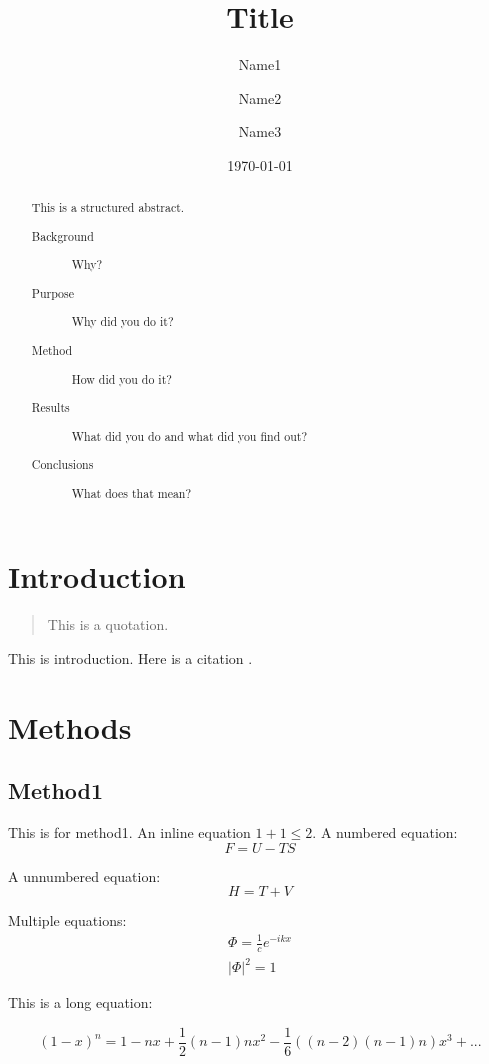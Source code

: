 \documentclass[
aps, %
prb, 
twocolumn, %
10pt, %
superscriptaddress, %
amsfont, %
amssymb, %
amsmath, %
showkeys, %
floats, %
final, 
letterpaper, %
balancelastpage, %
flushbottom, %
citeautoscript,
]{revtex4-2}
\begin{document}
\title{Title}
\author{Name1}
\author{Name2}
\author{Name3}
\date{\today}

\begin{abstract}
This is a structured abstract.
\begin{description}
\item[Background] Why?
\item[Purpose] Why did you do it?
\item[Method] How did you do it?
\item[Results] What did you do and what did you find out?
\item[Conclusions] What does that mean?
\end{description}
\end{abstract}


\maketitle

\section{Introduction}
\begin{quotation}
This is a quotation.
\end{quotation}
This is introduction. Here is a citation \cite{PhysRevB.78.104104}.

\section{Methods}
\subsection{Method1}
This is for method1. An inline equation $1+1\leq2$.
A numbered equation:
\begin{equation}
F=U-TS
\end{equation}

A unnumbered equation:
\[H=T+V\]

Multiple equations:
\begin{eqnarray}
\Phi=\frac{1}{c}e^{-ikx}\\
|\Phi|^2=1
\end{eqnarray}

This is a long equation:
\begin{widetext}
\[(1-x)^n=1-nx+\frac{1}{2}(n-1)nx^2-\frac{1}{6}((n-2)(n-1)n)x^3+...\]
\end{widetext}
\end{document}
